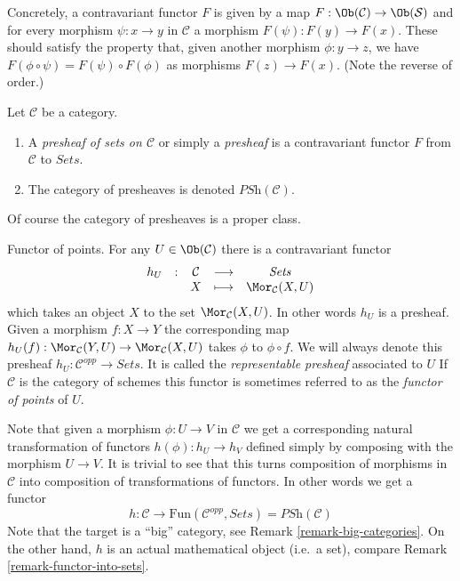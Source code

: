 \noindent
Concretely, a contravariant functor $F$ is given
by a map $F : \Ob(\mathcal{C}) \to
\Ob(\mathcal{S})$ and for every morphism
$\psi : x \to y$ in $\mathcal{C}$ a morphism
$F(\psi) : F(y) \to F(x)$. These should satisfy the property
that, given another morphism
$\phi : y \to z$, we have $F(\phi \circ \psi)
= F(\psi) \circ F(\phi)$ as morphisms $F(z) \to F(x)$.
(Note the reverse of order.)

\begin{definition}
\label{definition-presheaf}
Let $\mathcal{C}$ be a category.
\begin{enumerate}
\item A {\it presheaf of sets on $\mathcal{C}$}
or simply a {\it presheaf} is a contravariant functor
$F$ from $\mathcal{C}$ to $\textit{Sets}$.
\item The category of presheaves is denoted $\textit{PSh}(\mathcal{C})$.
\end{enumerate}
\end{definition}

\noindent
Of course the category of presheaves is a proper class.

\begin{example}
\label{example-hom-functor}
Functor of points.
For any $U\in \Ob(\mathcal{C})$ there is a contravariant
functor
$$
\begin{matrix}
h_U & : & \mathcal{C}
&
\longrightarrow
&
\textit{Sets} \\
&&
X
&
\longmapsto
&
\Mor_\mathcal{C}(X, U)
\end{matrix}
$$
which takes an object $X$ to the set
$\Mor_\mathcal{C}(X, U)$. In other words $h_U$ is a presheaf.
Given a morphism $f : X\to Y$ the corresponding map
$h_U(f) :  \Mor_\mathcal{C}(Y, U)\to \Mor_\mathcal{C}(X, U)$
takes $\phi$ to $\phi\circ f$. We will always denote
this presheaf $h_U : \mathcal{C}^{opp} \to \textit{Sets}$.
It is called the {\it representable presheaf} associated to $U$
If $\mathcal{C}$ is the category of schemes this functor is
sometimes referred to as the
\emph{functor of points} of $U$.
\end{example}

\noindent
Note that given a morphism $\phi : U \to V$ in $\mathcal{C}$ we get a
corresponding natural transformation of functors
$h(\phi) : h_U \to h_V$ defined simply by composing with the morphism
$U \to V$. It is trivial to see that this turns
composition of morphisms in $\mathcal{C}$ into composition of
transformations of functors. In other words we get a functor
$$
h :
\mathcal{C}
\longrightarrow
\text{Fun}(\mathcal{C}^{opp}, \textit{Sets}) = \textit{PSh}(\mathcal{C})
$$
Note that the target is a ``big'' category, see
Remark \ref{remark-big-categories}. On the other hand,
$h$ is an actual mathematical object (i.e.\ a set), compare Remark
\ref{remark-functor-into-sets}.

